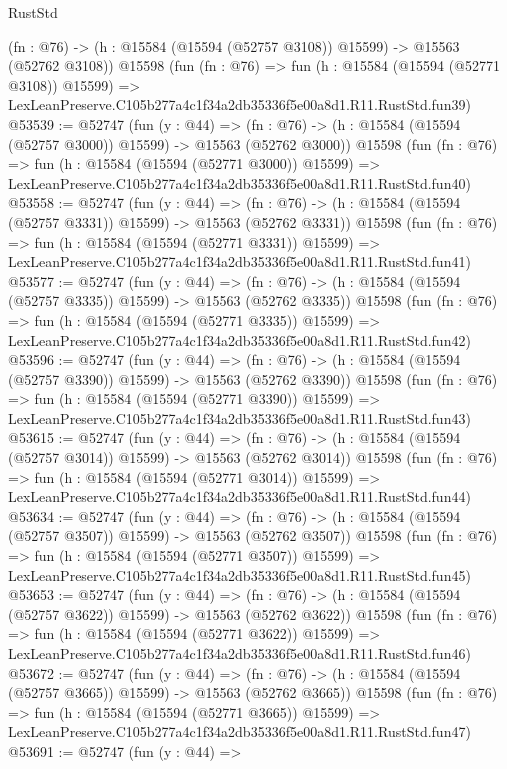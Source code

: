 \begin{lexlean}{RustStd}
\begin{coremodule}
    (fn : @76) -> (h : @15584 (@15594 (@52757 @3108)) @15599) -> @15563 (@52762 @3108))
    @15598
    (fun (fn : @76) =>
    fun (h : @15584 (@15594 (@52771 @3108)) @15599) =>
    LexLeanPreserve.C105b277a4c1f34a2db35336f5e00a8d1.R11.RustStd.fun39)
@53539 := @52747
    (fun (y : @44) =>
    (fn : @76) -> (h : @15584 (@15594 (@52757 @3000)) @15599) -> @15563 (@52762 @3000))
    @15598
    (fun (fn : @76) =>
    fun (h : @15584 (@15594 (@52771 @3000)) @15599) =>
    LexLeanPreserve.C105b277a4c1f34a2db35336f5e00a8d1.R11.RustStd.fun40)
@53558 := @52747
    (fun (y : @44) =>
    (fn : @76) -> (h : @15584 (@15594 (@52757 @3331)) @15599) -> @15563 (@52762 @3331))
    @15598
    (fun (fn : @76) =>
    fun (h : @15584 (@15594 (@52771 @3331)) @15599) =>
    LexLeanPreserve.C105b277a4c1f34a2db35336f5e00a8d1.R11.RustStd.fun41)
@53577 := @52747
    (fun (y : @44) =>
    (fn : @76) -> (h : @15584 (@15594 (@52757 @3335)) @15599) -> @15563 (@52762 @3335))
    @15598
    (fun (fn : @76) =>
    fun (h : @15584 (@15594 (@52771 @3335)) @15599) =>
    LexLeanPreserve.C105b277a4c1f34a2db35336f5e00a8d1.R11.RustStd.fun42)
@53596 := @52747
    (fun (y : @44) =>
    (fn : @76) -> (h : @15584 (@15594 (@52757 @3390)) @15599) -> @15563 (@52762 @3390))
    @15598
    (fun (fn : @76) =>
    fun (h : @15584 (@15594 (@52771 @3390)) @15599) =>
    LexLeanPreserve.C105b277a4c1f34a2db35336f5e00a8d1.R11.RustStd.fun43)
@53615 := @52747
    (fun (y : @44) =>
    (fn : @76) -> (h : @15584 (@15594 (@52757 @3014)) @15599) -> @15563 (@52762 @3014))
    @15598
    (fun (fn : @76) =>
    fun (h : @15584 (@15594 (@52771 @3014)) @15599) =>
    LexLeanPreserve.C105b277a4c1f34a2db35336f5e00a8d1.R11.RustStd.fun44)
@53634 := @52747
    (fun (y : @44) =>
    (fn : @76) -> (h : @15584 (@15594 (@52757 @3507)) @15599) -> @15563 (@52762 @3507))
    @15598
    (fun (fn : @76) =>
    fun (h : @15584 (@15594 (@52771 @3507)) @15599) =>
    LexLeanPreserve.C105b277a4c1f34a2db35336f5e00a8d1.R11.RustStd.fun45)
@53653 := @52747
    (fun (y : @44) =>
    (fn : @76) -> (h : @15584 (@15594 (@52757 @3622)) @15599) -> @15563 (@52762 @3622))
    @15598
    (fun (fn : @76) =>
    fun (h : @15584 (@15594 (@52771 @3622)) @15599) =>
    LexLeanPreserve.C105b277a4c1f34a2db35336f5e00a8d1.R11.RustStd.fun46)
@53672 := @52747
    (fun (y : @44) =>
    (fn : @76) -> (h : @15584 (@15594 (@52757 @3665)) @15599) -> @15563 (@52762 @3665))
    @15598
    (fun (fn : @76) =>
    fun (h : @15584 (@15594 (@52771 @3665)) @15599) =>
    LexLeanPreserve.C105b277a4c1f34a2db35336f5e00a8d1.R11.RustStd.fun47)
@53691 := @52747
    (fun (y : @44) =>

\end{coremodule}
\end{lexlean}
